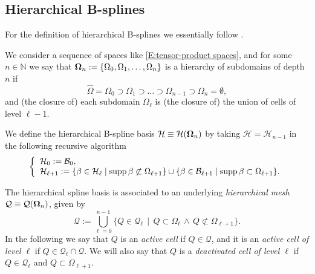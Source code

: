\documentclass[a4paper]{siamltex1213}
\newcommand{\Rd}{\color{red}}
\renewcommand{\Rd}{\color{black}}
\newcommand\NN{\mathbb N}
\newcommand\BB{\mathcal B}
\newcommand\QQ{\mathcal Q}
\newcommand\HH{\mathcal H}
\let\hat\widehat
\begin{document}
\subsection{Hierarchical B-splines}
For the definition of hierarchical B-splines we {\Rd essentially follow \cite{Kraft,Vuong_giannelli_juttler_simeon}}. 

\begin{definition} \label{def:hierarchical}
We consider a sequence of spaces like \eqref{E:tensor-product spaces}, and for some $n \in \NN$ we say that ${\bf\Omega}_n := \{\Omega_0,\Omega_1,\dots,\Omega_n\}$ is a hierarchy of subdomains of depth $n$ if
\begin{equation*}
\hat \Omega = \Omega_0 \supset \Omega_1 \supset \dots \supset 
\Omega_{n-1}\supset \Omega_n = \emptyset,
\end{equation*}
and (the closure of) each subdomain $\Omega_\ell$ is (the closure of) the union of cells of level $\ell-1$.

We define the hierarchical B-spline basis ${\HH} \equiv {\HH}({\bf\Omega}_n)$ by taking $\HH = \HH_{n-1}$ in the following recursive algorithm
\begin{equation}\label{E:Hierarchical basis}
\left \{
\begin{array}{l}
\HH_0 := \BB_0, \\
\HH_{\ell+1} := \{\beta \in \HH_\ell \mid \supp \beta \not \subset \Omega_{\ell+1} \} \cup \{\beta \in \BB_{\ell+1} \mid \supp \beta \subset \Omega_{\ell+1}\}.
\end{array}
\right.
\end{equation} 

\end{definition}
The hierarchical spline basis is associated to an underlying \emph{hierarchical mesh} $\QQ \equiv \QQ({\bf\Omega}_n)$, given by
\begin{equation}\label{E:hierarchical mesh}
\QQ:= \bigcup_{\ell = 0}^{n-1} \{ Q\in\QQ_\ell\,\mid\, Q\subset \Omega_\ell 
\,\wedge\, Q\not\subset \Omega_{\ell+1}\}.
\end{equation}
In the following we say that $Q$ is an \emph{active cell} if $Q \in \QQ$, and it is an \emph{active cell of level $\ell$} if $Q \in \QQ_\ell \cap \QQ$. We will also say that $Q$ is a \emph{deactivated cell of level $\ell$} if $Q \in \QQ_\ell$ and $Q \subset \Omega_{\ell+1}$. 
\end{document}
